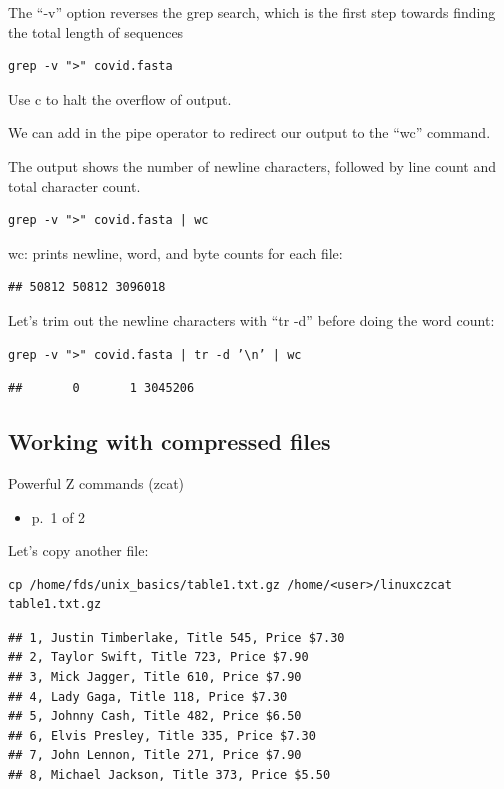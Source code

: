 \documentclass[
]{book}
\providecommand{\tightlist}{%
  \setlength{\itemsep}{0pt}\setlength{\parskip}{0pt}}
\begin{document}
The ``-v'' option reverses the grep search, which is the first step towards finding the total length of sequences

\begin{verbatim}
grep -v ">" covid.fasta
\end{verbatim}

Use c to halt the overflow of output.

We can add in the pipe operator to redirect our output to the ``wc'' command.

The output shows the number of newline characters, followed by line count and total character count.

\begin{verbatim}
grep -v ">" covid.fasta | wc
\end{verbatim}

wc: prints newline, word, and byte counts for each file:

\begin{verbatim}
## 50812 50812 3096018
\end{verbatim}

Let's trim out the newline characters with ``tr -d'' before doing the word count:

\begin{verbatim}
grep -v ">" covid.fasta | tr -d ’\n’ | wc
\end{verbatim}

\begin{verbatim}
##       0       1 3045206
\end{verbatim}

\hypertarget{working-with-compressed-files}{%
\subsection{Working with compressed files}\label{working-with-compressed-files}}

Powerful Z commands (zcat)

\begin{itemize}
\tightlist
\item
  p.~1 of 2
\end{itemize}

Let's copy another file:

\begin{verbatim}
cp /home/fds/unix_basics/table1.txt.gz /home/<user>/linuxczcat table1.txt.gz
\end{verbatim}

\begin{verbatim}
## 1, Justin Timberlake, Title 545, Price $7.30
## 2, Taylor Swift, Title 723, Price $7.90
## 3, Mick Jagger, Title 610, Price $7.90
## 4, Lady Gaga, Title 118, Price $7.30
## 5, Johnny Cash, Title 482, Price $6.50
## 6, Elvis Presley, Title 335, Price $7.30
## 7, John Lennon, Title 271, Price $7.90
## 8, Michael Jackson, Title 373, Price $5.50
\end{verbatim}
\end{document}
